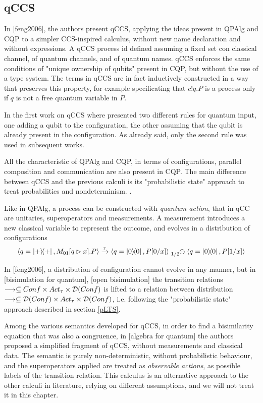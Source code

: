 
\subsection{qCCS}

In [feng2006], the authors present qCCS, applying the ideas present in QPAlg and CQP to a simpler CCS-inspired calculus, without new name declaration and without expressions. A qCCS process id defined assuming a fixed set con classical channel, of quantum channels, and of quantum names. qCCS enforces the same conditions of "unique ownership of qubits" present in CQP, but without the use of a type system. The terms in qCCS are in fact inductively constructed in a way that preserves this property, for example specificating that $c!q.P$ is a process only if $q$ is not a free quantum variable in $P$.


In the first work on qCCS where presented two different rules for quantum input, one adding a qubit to the configuration, the other assuming that the qubit is already present in the configuration. As already said, only the second rule was used in subsequent works.


All the characteristic of QPAlg and CQP, in terms of configurations, parallel composition and communication are also present in CQP. The main difference between qCCS and the previous calculi is its "probabilistic state" approach to treat probabilities and nondeterminism. .


Like in QPAlg, a process can be constructed with \textit{quantum action}, that in qCC  are unitaries, superoperators and measurements. A measurement introduces a new classical variable to represent the outcome, and evolves in a distribution of configurations
\[ \confw{q = \proj{+}, M_{01}[q \rhd x].P} \xrightarrow{\tau} \confw{q = \proj{0}, P[0/x]} \psum{1/2} \confw{q = \proj{0}, P[1/x]} 
\]

In [feng2006], a distribution of configuration cannot evolve in any manner, but in [bisimulation for quantum], [open bisimulation] the transition relations $\longrightarrow \subseteq Conf \times Act_\tau \times \mathcal{D}(Conf)$ is lifted to a relation between distribution $\longrightarrow \subseteq \mathcal{D}(Conf) \times Act_\tau \times \mathcal{D}(Conf)$, i.e. following the "probabilistic state" approach described in section \ref{pLTS}.


Among the various semantics developed for qCCS, in order to find a bisimilarity equation that was also a congruence, in [algebra for quantum] the authors proposed a simplified fragment of qCCS, without measurements and classical data. The semantic is purely non-deterministic, without probabilistic behaviour, and the superoperators applied are treated as \textit{observable actions}, as possible labels of the transition relation. This calculus is an alternative approach to the other calculi in literature, relying on different assumptions, and we will not treat it in this chapter.
